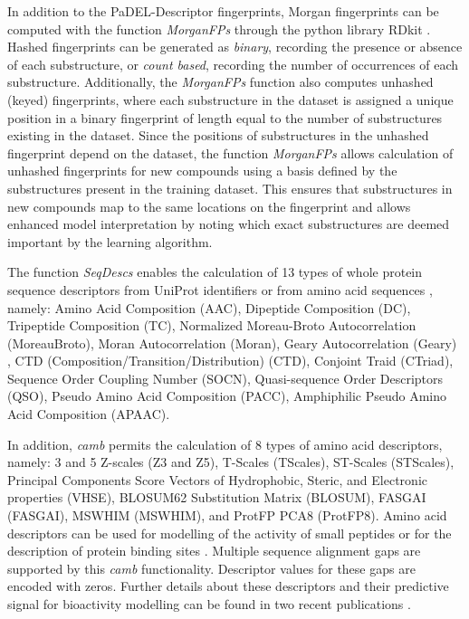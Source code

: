 \documentclass[twoside,a4wide,10pt]{article}
\begin{document}
In addition to the PaDEL-Descriptor fingerprints, Morgan fingerprints can be computed with the function {\it MorganFPs}
through the python library RDkit \citep{rdkit}.
Hashed fingerprints can be generated as \textit{binary}, recording the presence or absence of each substructure,
or \textit{count based}, recording the number of occurrences of each substructure.
Additionally, the {\it MorganFPs} function also computes unhashed (keyed) fingerprints, 
where each substructure in the dataset is assigned a unique position in a binary fingerprint of length equal to the number of substructures existing in the dataset.
Since the positions of substructures in the unhashed fingerprint depend on the dataset, the function {\it MorganFPs} allows calculation of unhashed fingerprints for new compounds using a basis defined by the substructures present in the training dataset.
This ensures that substructures in new compounds map to the same locations on the fingerprint and allows enhanced model interpretation by noting which exact substructures are deemed important by the learning algorithm.

The function {\it SeqDescs} enables the calculation of 13 types of whole protein sequence descriptors
from UniProt identifiers or from amino acid sequences \citep{protr}, namely:
Amino Acid Composition (AAC), Dipeptide Composition (DC), Tripeptide Composition (TC), Normalized Moreau-Broto Autocorrelation (MoreauBroto), Moran Autocorrelation (Moran), Geary Autocorrelation (Geary) , CTD (Composition/Transition/Distribution) (CTD), Conjoint Traid (CTriad), Sequence Order Coupling Number (SOCN), Quasi-sequence Order Descriptors (QSO), Pseudo Amino Acid Composition (PACC), Amphiphilic Pseudo Amino Acid Composition (APAAC).

In addition, {\it camb} permits the calculation of 8 types of amino acid descriptors, namely:
3 and 5 Z-scales (Z3 and Z5), T-Scales (TScales), ST-Scales (STScales), 
Principal Components Score Vectors of Hydrophobic, Steric, and Electronic properties (VHSE), 
BLOSUM62 Substitution Matrix (BLOSUM), FASGAI (FASGAI), MSWHIM (MSWHIM), and ProtFP PCA8 (ProtFP8).
Amino acid descriptors can be used for modelling of the activity of small peptides
or for the description of protein binding sites \citep{AA_benchmark,adenosine,cortesCOX,cortesReview}.
Multiple sequence alignment gaps are supported by this {\it camb} functionality.
Descriptor values for these gaps are encoded with zeros.
Further details about these descriptors and their predictive signal
for bioactivity modelling can be found in two recent publications \citep{AA_benchmark1,AA_benchmark}.
\end{document}
